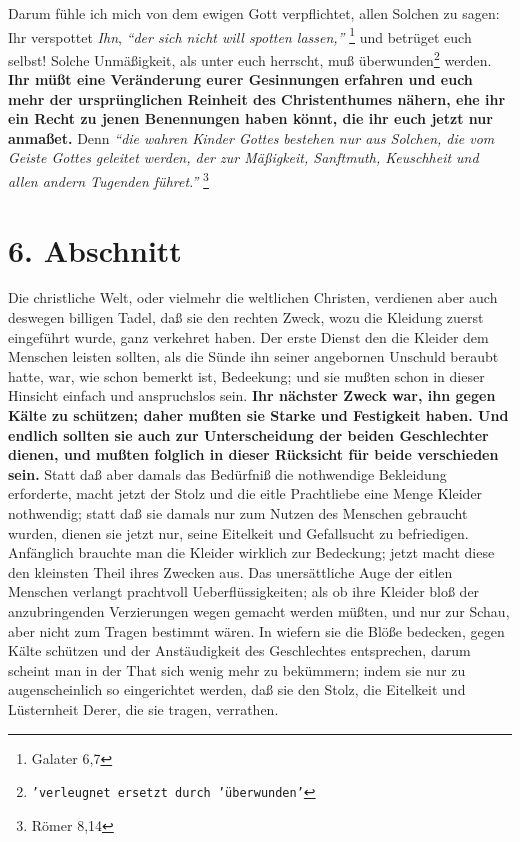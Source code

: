 \medskip

Darum fühle ich mich von dem ewigen Gott verpflichtet, allen Solchen zu sagen:
Ihr verspottet \textit{Ihn},
\textit{"`der sich nicht will spotten lassen,"'}
\footnote{Galater 6,7}
und betrüget euch selbst! Solche Unmäßigkeit, als unter euch herrscht, muß
überwunden\footnote{\texttt{'verleugnet ersetzt durch 'überwunden'}} werden. \textbf{Ihr müßt eine Veränderung eurer Gesinnungen erfahren und euch
mehr der ursprünglichen Reinheit des Christenthumes nähern, ehe ihr ein Recht zu
jenen Benennungen haben könnt, die ihr euch jetzt nur anmaßet.}  Denn
\textit{"`die wahren
Kinder Gottes bestehen nur aus Solchen, die vom Geiste Gottes geleitet werden,
der zur Mäßigkeit, Sanftmuth, Keuschheit und allen andern Tugenden
führet."'}
\footnote{Römer 8,14}

\section{6. Abschnitt} \label{kap14_ab6}

Die christliche Welt, oder vielmehr die weltlichen Christen, verdienen aber auch
deswegen billigen Tadel, daß sie den rechten Zweck, wozu die Kleidung zuerst
eingeführt wurde, ganz verkehret haben. Der erste Dienst den die Kleider dem
Menschen leisten sollten, als die Sünde ihn seiner angebornen Unschuld beraubt
hatte, war, wie schon bemerkt ist, Bedeekung; und sie mußten schon in dieser
Hinsicht einfach und anspruchslos sein. \textbf{Ihr nächster Zweck war, ihn gegen Kälte
zu schützen; daher mußten sie Starke und Festigkeit haben. Und endlich sollten
sie auch zur Unterscheidung der beiden Geschlechter dienen, und mußten folglich
in dieser Rücksicht für beide verschieden sein.} Statt daß aber damals das
Bedürfniß die nothwendige Bekleidung erforderte, macht jetzt der Stolz und die
eitle Prachtliebe eine Menge Kleider nothwendig; statt daß sie damals nur zum
Nutzen des Menschen gebraucht wurden, dienen sie jetzt nur, seine Eitelkeit und
Gefallsucht zu befriedigen. Anfänglich brauchte man die Kleider wirklich zur
Bedeckung; jetzt macht diese den kleinsten Theil ihres Zwecken aus. Das
unersättliche Auge der eitlen Menschen verlangt prachtvoll Ueberflüssigkeiten;
als ob ihre Kleider bloß der anzubringenden Verzierungen wegen gemacht werden
müßten, und nur zur Schau, aber nicht zum Tragen bestimmt wären. In wiefern sie
die Blöße bedecken, gegen Kälte schützen und der Anstäudigkeit des Geschlechtes
entsprechen, darum scheint man in der That sich wenig mehr zu bekümmern; indem
sie nur zu augenscheinlich so eingerichtet werden, daß sie den Stolz, die
Eitelkeit und Lüsternheit Derer, die sie tragen, verrathen.

